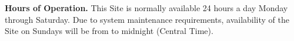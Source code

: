 \textbf{Hours of Operation.}
This Site is normally available 24 hours a day Monday through Saturday. Due to
system maintenance requirements, availability of the Site on Sundays will be
from {} to midnight (Central Time).